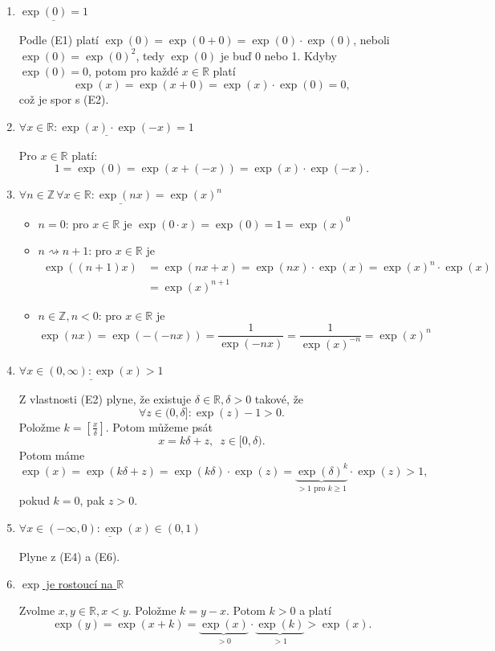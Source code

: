 \begin{enumerate}
	\item[(E3)] $\underline{\exp(0)=1}$
	\par Podle (E1) platí $\exp(0) = \exp(0+0) = \exp(0)\cdot \exp(0)$, neboli $\exp(0)=\exp(0)^2$, tedy
	$\exp(0)$ je buď 0 nebo 1. Kdyby $\exp(0)=0$, potom pro každé $x\in \mathbb R $ platí
	$$
	    \exp(x) = \exp(x+0)=\exp(x)\cdot \exp(0) = 0,
	$$
	což je spor s (E2).
	\item[(E4)] $\underline{\forall x \in \mathbb R : \exp(x)\cdot \exp(-x)=1}$
	\par Pro $x\in \mathbb R $ platí:
	$$
	    1=\exp(0)=\exp(x+(-x))=\exp(x)\cdot \exp(-x).
	$$
	\item[(E5)] $\underline{\forall n \in \mathbb Z \, \forall x \in \mathbb R : \exp(nx)=\exp(x)^n}$
	\begin{itemize}
		\item $n=0$: pro $x \in \mathbb R $ je $\exp(0\cdot x)=\exp(0)=1=\exp(x)^0$
		\item $n \rightsquigarrow n+1$: pro $x \in \mathbb R $ je
		\begin{align*}
			\exp((n+1)x) & =\exp(nx+x) = \exp(nx)\cdot \exp(x) = \exp(x)^n \cdot \exp(x)\\
			&=\exp(x)^{n+1}
		\end{align*}
		\item $n\in \mathbb Z , n < 0$: pro $x \in \mathbb R $ je
		$$
			\exp(nx) = \exp(-(-nx)) = \frac{1}{\exp(-nx)}=\frac{1}{\exp(x)^{-n}} = \exp(x)^n
		$$
	\end{itemize}
	\item[(E6)] $\underline{\forall x \in(0,\infty):\exp(x)>1}$
	\par Z vlastnosti (E2) plyne, že existuje $\delta \in \mathbb R , \delta > 0$ takové, že
	$$
	    \forall z \in (0,\delta]: \exp(z)-1 > 0.
	$$
	Položme $k=\left [ \frac{x}{\delta} \right ] $. Potom můžeme psát
	$$
	    x=k\delta + z, \,\,\, z \in [0,\delta).
	$$
	Potom máme
	$$
	    \exp(x) = \exp(k\delta + z)=\exp(k\delta) \cdot \exp(z) = \underbrace{\exp(\delta)^k}_{>1 \textrm{ pro } k\geq 1}\cdot \exp(z)>1,
	$$
	pokud $k=0$, pak $z>0$.
	\item[(E7)] $\underline{\forall x \in (-\infty, 0): \exp(x)\in(0,1)}$
	\par Plyne z (E4) a (E6).
	\item[(E8)] \underline{$\exp$ je rostoucí na $\mathbb R $}
	\par Zvolme $x,y \in \mathbb R , x<y$. Položme $k=y-x$. Potom $k>0$ a platí
	$$
	    \exp(y) = \exp(x+k) = \underbrace{\exp(x)}_{>0}\cdot \underbrace{\exp(k)}_{>1}>\exp(x).
$$
\end{enumerate}
